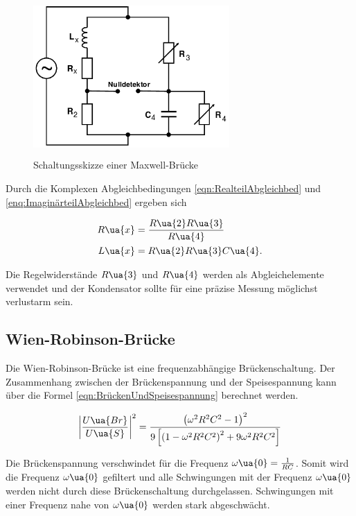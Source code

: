 \begin{figure}
  \includegraphics[width=7.50cm, height=6cm]{V302_MaxwellBrücke.png}
  \caption{Schaltungsskizze einer Maxwell-Brücke\cite{anleitung01}}
  \label{fig:Maxwell-Brücke}
\end{figure}

Durch die Komplexen Abgleichbedingungen \eqref{eqn:RealteilAbgleichbed} und
\eqref{enq:ImaginärteilAbgleichbed} ergeben sich

\begin{align}
  R\ua{x} &= \frac{R\ua{2}R\ua{3}}{R\ua{4}}\label{eqn:Maxwell_Rx}\\
  L\ua{x} &= R\ua{2}R\ua{3}C\ua{4}.\label{eqn:Maxwell_Lx}
\end{align}

Die Regelwiderstände $R\ua{3}$ und $R\ua{4}$ werden als Abgleichelemente verwendet
und der Kondensator sollte für eine präzise Messung möglichst verlustarm sein.

\subsection{Wien-Robinson-Brücke}
Die Wien-Robinson-Brücke ist eine frequenzabhängige Brückenschaltung. Der Zusammenhang
zwischen der Brückenspannung und der Speisespannung kann über die Formel
\eqref{eqn:BrückenUndSpeisespannung} berechnet werden.

\begin{equation}
  \label{eqn:Wien-Robinson-Brücke}
  \left|\frac{U\ua{Br}}{U\ua{S}}\right|^2 = \frac{\left(\omega^2R^2C^2 - 1\right)^2}{
  9\left[\left(1 - \omega^2R^2C^2\right)^2 + 9\omega^2R^2C^2\right]}
\end{equation}

Die Brückenspannung verschwindet für die Frequenz $\omega\ua{0} = \frac{1}{RC}$.
Somit wird die Frequenz $\omega\ua{0}$ gefiltert und alle Schwingungen mit
der Frequenz $\omega\ua{0}$ werden nicht durch diese Brückenschaltung durchgelassen.
Schwingungen mit einer Frequenz nahe von $\omega\ua{0}$ werden stark abgeschwächt.

